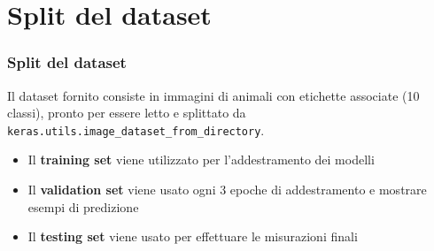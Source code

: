 \documentclass{beamer}
\newcommand{\dflvspace}{\vspace{10pt}}
\begin{document}
\section{Split del dataset}
\begin{frame}
    \frametitle{Split del dataset}
    
    Il dataset fornito consiste in immagini di animali con etichette associate (10 classi),
    pronto per essere letto e splittato da \texttt{keras.utils.image\_dataset\_from\_directory}.
    
    \dflvspace
    \dflvspace
    
    \begin{center}
    \end{center}
    
    \dflvspace
    \dflvspace
    
    \begin{itemize}
    	\item Il \textbf{training set} viene utilizzato per l'addestramento dei modelli
    	\item Il \textbf{validation set} viene usato ogni 3 epoche di addestramento e mostrare esempi di predizione
    	\item Il \textbf{testing set} viene usato per effettuare le misurazioni finali
    \end{itemize}
    
\end{frame}
\end{document}
